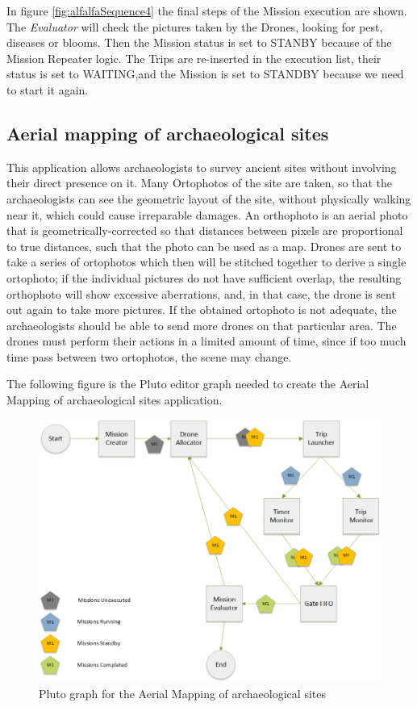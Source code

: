 In figure \ref{fig:alfalfaSequence4} the final steps of the Mission execution are shown.
The \textit{Evaluator} will check the pictures taken by the Drones, looking for pest, diseases or blooms.
Then the Mission status is set to STANBY because of the Mission Repeater logic.
The Trips are re-inserted in the execution list, their status is set to WAITING,and the Mission is set to STANDBY because we need to start it again.
\\

\subsection{Aerial mapping of archaeological sites}\label{aerialMapping}

This application allows archaeologists to survey ancient sites without involving their direct presence on it.
Many Ortophotos of the site are taken, so that the archaeologists can see the geometric layout of the site, without physically walking near it, which could cause irreparable damages.
An orthophoto is an aerial photo that is geometrically-corrected so that distances between pixels are proportional to true distances, such that the photo can be used as a map.
Drones are sent to take a series of ortophotos which then will be stitched together to derive a single ortophoto; if the individual pictures do not have sufficient overlap, the resulting orthophoto will show excessive aberrations, and, in that case, the drone is sent out again to take more pictures.
If the obtained ortophoto is not adequate, the archaeologists should be able to send more drones on that particular area.
The drones must perform their actions in a limited amount of time, since if too much time pass between two ortophotos, the scene may change.

The following figure is the Pluto editor graph needed to create the Aerial Mapping of archaeological sites application. 

\begin{figure}[H]
  \centering
  \includegraphics[width=\linewidth]{pictures/Putti_Diagram.png}
  \caption{Pluto graph for the Aerial Mapping of archaeological sites}
  \label{fig:puttiGraph}
\end{figure}

